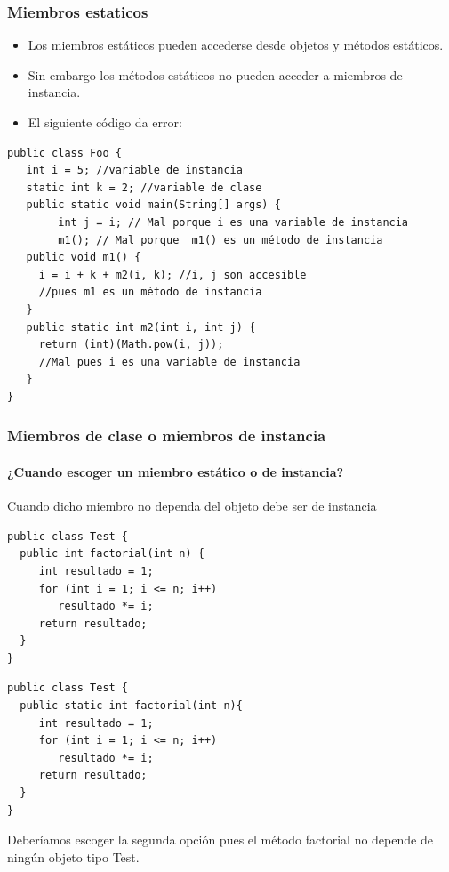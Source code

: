 \documentclass{beamer}
\begin{document}
\begin{frame}[fragile]
    \frametitle{Miembros estaticos}
\begin{itemize}[<+->]
\item Los miembros estáticos pueden accederse desde objetos y métodos estáticos.
\item Sin embargo los métodos estáticos no pueden acceder a miembros de instancia.
\item El siguiente código da error:
\end{itemize}  
\pause
\begin{scriptsize}
\begin{verbatim}
public class Foo {
   int i = 5; //variable de instancia
   static int k = 2; //variable de clase
   public static void main(String[] args) {
   		int j = i; // Mal porque i es una variable de instancia
        m1(); // Mal porque  m1() es un método de instancia 
   public void m1() {
     i = i + k + m2(i, k); //i, j son accesible
     //pues m1 es un método de instancia
   }
   public static int m2(int i, int j) {
     return (int)(Math.pow(i, j));
     //Mal pues i es una variable de instancia
   }
}
\end{verbatim}
\end{scriptsize}
\end{frame}

\begin{frame}[fragile]
    \frametitle{Miembros de clase o miembros de instancia}
   \framesubtitle{¿Cuando escoger un miembro estático o de instancia?}
   \pause
   Cuando dicho miembro no dependa del objeto debe ser de instancia
\begin{multicols}{2}
\begin{scriptsize}
\begin{verbatim}
public class Test {
  public int factorial(int n) {
     int resultado = 1;
     for (int i = 1; i <= n; i++)
        resultado *= i;
     return resultado;
  }
}
\end{verbatim}
\begin{verbatim}
public class Test {
  public static int factorial(int n){
     int resultado = 1;
     for (int i = 1; i <= n; i++)
        resultado *= i;
     return resultado;
  }
}
\end{verbatim}
\end{scriptsize}
\end{multicols}
\pause
\alert{Deberíamos escoger la segunda opción pues el  método factorial no depende de ningún objeto tipo Test.}
\end{frame}
\end{document}
